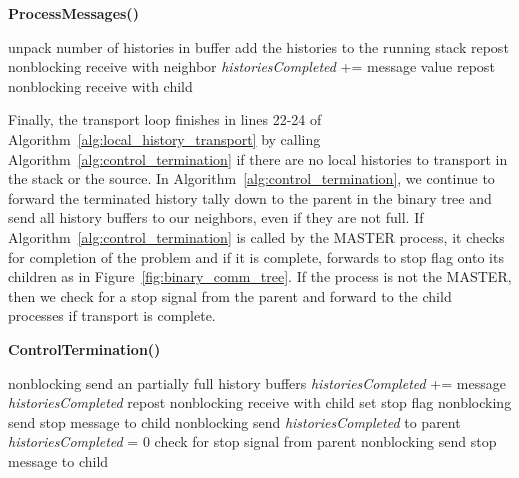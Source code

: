 \begin{algorithm}[h!]
  \caption{\textbf{ProcessMessages()}}
  \label{alg:process_messages}
  \begin{algorithmic}[1]
    \State unpack number of histories in buffer
    \State add the histories to the running stack
    \State repost nonblocking receive with neighbor
    \EndFor
    \State \textit{historiesCompleted} += message value
    \State repost nonblocking receive with child
    \EndFor
  \end{algorithmic}
\end{algorithm}

Finally, the transport loop finishes in lines 22-24 of
Algorithm~\ref{alg:local_history_transport} by calling
Algorithm~\ref{alg:control_termination} if there are no local
histories to transport in the stack or the source. In
Algorithm~\ref{alg:control_termination}, we continue to forward the
terminated history tally down to the parent in the binary tree and
send all history buffers to our neighbors, even if they are not
full. If Algorithm~\ref{alg:control_termination} is called by the
MASTER process, it checks for completion of the problem and if it is
complete, forwards to stop flag onto its children as in
Figure~\ref{fig:binary_comm_tree}. If the process is not the MASTER,
then we check for a stop signal from the parent and forward to the
child processes if transport is complete.

\begin{algorithm}[h!]
  \caption{\textbf{ControlTermination()}}
  \label{alg:control_termination}
  \begin{algorithmic}[1]
    \State nonblocking send an partially full history buffers
    \State \textit{historiesCompleted} += message \textit{historiesCompleted}
    \State repost nonblocking receive with child
    \EndFor
    \State set stop flag
    \State nonblocking send stop message to child
    \EndFor
    \EndIf
    \Else
    \State nonblocking send \textit{historiesCompleted} to parent
    \State \textit{historiesCompleted} = 0
    \State check for stop signal from parent
    \State nonblocking send stop message to child
    \EndFor
    \EndIf
    \EndIf
  \end{algorithmic}
\end{algorithm}

